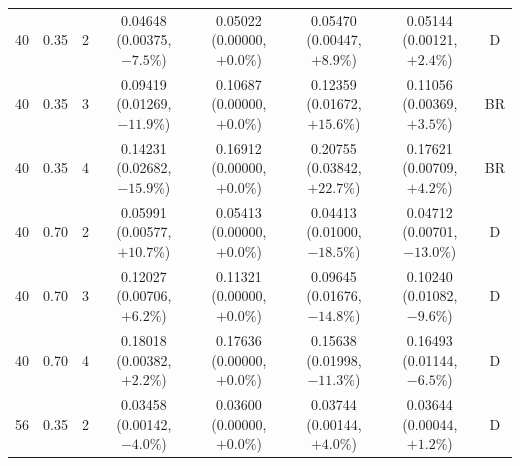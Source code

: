 \begin{longtable}{rrrccccc}
40 & 0.35 & 2 & \shortstack{0.04648\\(0.00375, $-7.5\%$)} & \shortstack{0.05022\\(0.00000, $+0.0\%$)} & \shortstack{0.05470\\(0.00447, $+8.9\%$)} & \shortstack{0.05144\\(0.00121, $+2.4\%$)} & D \\
40 & 0.35 & 3 & \shortstack{0.09419\\(0.01269, $-11.9\%$)} & \shortstack{0.10687\\(0.00000, $+0.0\%$)} & \shortstack{0.12359\\(0.01672, $+15.6\%$)} & \shortstack{0.11056\\(0.00369, $+3.5\%$)} & BR \\
40 & 0.35 & 4 & \shortstack{0.14231\\(0.02682, $-15.9\%$)} & \shortstack{0.16912\\(0.00000, $+0.0\%$)} & \shortstack{0.20755\\(0.03842, $+22.7\%$)} & \shortstack{0.17621\\(0.00709, $+4.2\%$)} & BR \\
40 & 0.70 & 2 & \shortstack{0.05991\\(0.00577, $+10.7\%$)} & \shortstack{0.05413\\(0.00000, $+0.0\%$)} & \shortstack{0.04413\\(0.01000, $-18.5\%$)} & \shortstack{0.04712\\(0.00701, $-13.0\%$)} & D \\
40 & 0.70 & 3 & \shortstack{0.12027\\(0.00706, $+6.2\%$)} & \shortstack{0.11321\\(0.00000, $+0.0\%$)} & \shortstack{0.09645\\(0.01676, $-14.8\%$)} & \shortstack{0.10240\\(0.01082, $-9.6\%$)} & D \\
40 & 0.70 & 4 & \shortstack{0.18018\\(0.00382, $+2.2\%$)} & \shortstack{0.17636\\(0.00000, $+0.0\%$)} & \shortstack{0.15638\\(0.01998, $-11.3\%$)} & \shortstack{0.16493\\(0.01144, $-6.5\%$)} & D \\
56 & 0.35 & 2 & \shortstack{0.03458\\(0.00142, $-4.0\%$)} & \shortstack{0.03600\\(0.00000, $+0.0\%$)} & \shortstack{0.03744\\(0.00144, $+4.0\%$)} & \shortstack{0.03644\\(0.00044, $+1.2\%$)} & D \\

\end{longtable}
